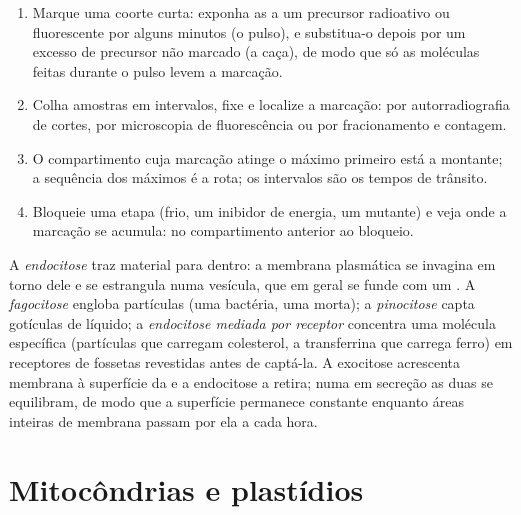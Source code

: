 \begin{method}\label{met:b1:eukaryotic-cell:pulsechase}
\begin{enumerate}
  \item Marque uma coorte curta: exponha as  a um precursor
        radioativo ou fluorescente por alguns minutos (o pulso), e
        substitua-o depois por um excesso de precursor não marcado (a
        caça), de modo que só as moléculas feitas durante o pulso levem
        a marcação.
  \item Colha amostras em intervalos, fixe e localize a marcação: por
        autorradiografia de cortes, por microscopia de fluorescência ou
        por fracionamento e contagem.
  \item O compartimento cuja marcação atinge o máximo primeiro está a
        montante; a sequência dos máximos é a rota; os intervalos são os
        tempos de trânsito.
  \item Bloqueie uma etapa (frio, um inibidor de energia, um mutante) e
        veja onde a marcação se acumula: no compartimento anterior ao
        bloqueio.
\end{enumerate}
\end{method}

\begin{definition}[Endocitose]\label{def:b1:eukaryotic-cell:endocytosis}
A \emph{endocitose} traz material para dentro: a
membrana plasmática se invagina em torno dele e se estrangula numa
vesícula, que em geral se funde com um . A \emph{fagocitose}
engloba partículas (uma bactéria, uma  morta); a
\emph{pinocitose} capta gotículas de líquido; a
\emph{endocitose mediada por receptor} concentra uma molécula
específica (partículas que carregam colesterol, a transferrina que
carrega ferro) em receptores de fossetas revestidas antes de captá-la. A
exocitose acrescenta membrana à superfície da  e a endocitose a
retira; numa  em secreção as duas se equilibram, de modo que a
superfície permanece constante enquanto áreas inteiras de membrana
passam por ela a cada hora.
\end{definition}

\section{Mitocôndrias e plastídios}

